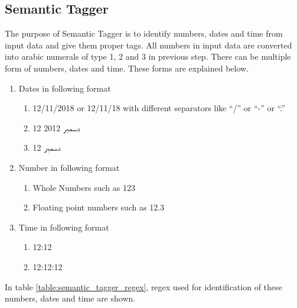 \subsection{Semantic Tagger}
The purpose of Semantic Tagger is to identify numbers, dates and time from input data and give them proper tags. 
All numbers in input data are converted into arabic numerals of type 1, 2 and 3 in previous step. 
There can be multiple form of numbers, dates and time. These forms are explained below.


\begin{enumerate}    
  \item Dates in following format

  \begin{enumerate}[label=\alph*.]
    \item 12/11/2018 or 12/11/18 with different separators like \enquote{/} or \enquote{-} or \enquote{.}
    \item \texturdu{12 دسمبر 2012}
    \item \texturdu{12 دسمبر}
  \end{enumerate}
  \item Number in following format
  \begin{enumerate}[label=\alph*.]
    \item Whole Numbers such as 123
    \item Floating point numbers such as 12.3
  \end{enumerate}

  \item Time in following format

  \begin{enumerate}[label=\alph*.]
    \item 12:12
    \item 12:12:12
  \end{enumerate}
\end{enumerate}


In table \ref{table:semantic_tagger_regex}, regex used for identification of these numbers, dates and time are shown.

